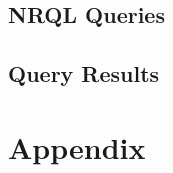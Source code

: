 \documentclass[a4paper,12pt]{report}
\begin{document}
\section{NRQL Queries}
\begin{center}
\end{center}
\section{Query Results}
\begin{center}
\end{center}
\begin{center}
\end{center}

\chapter{Appendix}
\appendix
\end{document}
